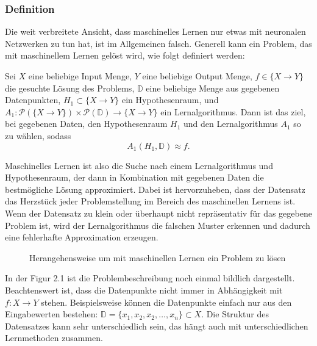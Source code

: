 \documentclass[12pt,letterpaper,ngerman]{article}
\begin{document}
\subsubsection{Definition}
Die weit verbreitete Ansicht, dass maschinelles Lernen nur etwas mit neuronalen 
Netzwerken zu tun hat, ist im Allgemeinen falsch. Generell kann ein Problem, 
das mit maschinellem Lernen gelöst wird, wie folgt definiert werden:
\begin{definition}
  Sei $X$ eine beliebige Input Menge, $Y$ eine beliebige Output Menge,
  $f \in \{X \to Y\}$ die gesuchte Lösung des Problems, 
  $\mathbb{D}$ eine beliebige Menge aus gegebenen Datenpunkten,
  $H_1 \subset \{X \to Y\}$ ein Hypothesenraum, und 
  $A_1: \mathcal{P}(\{X \to Y\}) \times 
  \mathcal{P}(\mathbb{D}) \to \{ X \to Y \} $
  ein Lernalgorithmus. Dann ist das ziel, bei gegebenen Daten,
  den Hypothesenraum $H_1$ und den Lernalgorithmus $A_1$ so zu wählen,
  sodass
  \[
    A_1(H_1, \mathbb{D}) \approx f.
  \]
\end{definition}
Maschinelles Lernen ist also die Suche nach einem Lernalgorithmus und 
Hypothesenraum, der dann in Kombination mit gegebenen Daten die bestmögliche
Lösung approximiert. Dabei ist hervorzuheben, dass der Datensatz das Herzstück
jeder Problemstellung im Bereich des maschinellen Lernens ist. Wenn der
Datensatz zu klein oder überhaupt nicht repräsentativ für das gegebene Problem 
ist, wird der Lernalgorithmus die falschen Muster erkennen und dadurch eine 
fehlerhafte Approximation erzeugen.
\begin{figure}[H]
  \begin{center}
    \caption{Herangehensweise um mit maschinellen Lernen ein Problem zu lösen}
  \end{center}
\end{figure}
\pagebreak
In der Figur 2.1 ist die Problembeschreibung noch einmal bildlich dargestellt.
Beachtenswert ist, dass die Datenpunkte nicht immer in Abhängigkeit mit 
$f: X \to Y$ stehen. Beispielsweise können die Datenpunkte einfach nur aus den
Eingabewerten bestehen: $\mathbb{D} = \{x_1,x_2,x_2, \dots, x_n\} \subset X$.
Die Struktur des Datensatzes kann sehr unterschiedlich sein, das hängt auch mit 
unterschiedlichen Lernmethoden zusammen.
\end{document}
